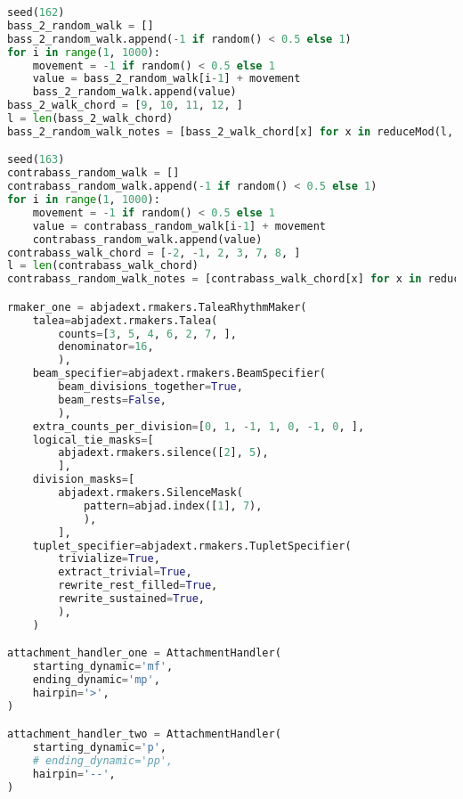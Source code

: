 \begin{lstlisting}[language=Python, caption=Invocation Source Code]
seed(162)
bass_2_random_walk = []
bass_2_random_walk.append(-1 if random() < 0.5 else 1)
for i in range(1, 1000):
    movement = -1 if random() < 0.5 else 1
    value = bass_2_random_walk[i-1] + movement
    bass_2_random_walk.append(value)
bass_2_walk_chord = [9, 10, 11, 12, ]
l = len(bass_2_walk_chord)
bass_2_random_walk_notes = [bass_2_walk_chord[x] for x in reduceMod(l, bass_2_random_walk)]

seed(163)
contrabass_random_walk = []
contrabass_random_walk.append(-1 if random() < 0.5 else 1)
for i in range(1, 1000):
    movement = -1 if random() < 0.5 else 1
    value = contrabass_random_walk[i-1] + movement
    contrabass_random_walk.append(value)
contrabass_walk_chord = [-2, -1, 2, 3, 7, 8, ]
l = len(contrabass_walk_chord)
contrabass_random_walk_notes = [contrabass_walk_chord[x] for x in reduceMod(l, contrabass_random_walk)]

rmaker_one = abjadext.rmakers.TaleaRhythmMaker(
    talea=abjadext.rmakers.Talea(
        counts=[3, 5, 4, 6, 2, 7, ],
        denominator=16,
        ),
    beam_specifier=abjadext.rmakers.BeamSpecifier(
        beam_divisions_together=True,
        beam_rests=False,
        ),
    extra_counts_per_division=[0, 1, -1, 1, 0, -1, 0, ],
    logical_tie_masks=[
        abjadext.rmakers.silence([2], 5),
        ],
    division_masks=[
        abjadext.rmakers.SilenceMask(
            pattern=abjad.index([1], 7),
            ),
        ],
    tuplet_specifier=abjadext.rmakers.TupletSpecifier(
        trivialize=True,
        extract_trivial=True,
        rewrite_rest_filled=True,
        rewrite_sustained=True,
        ),
    )

attachment_handler_one = AttachmentHandler(
    starting_dynamic='mf',
    ending_dynamic='mp',
    hairpin='>',
)

attachment_handler_two = AttachmentHandler(
    starting_dynamic='p',
    # ending_dynamic='pp',
    hairpin='--',
)


\end{lstlisting}

